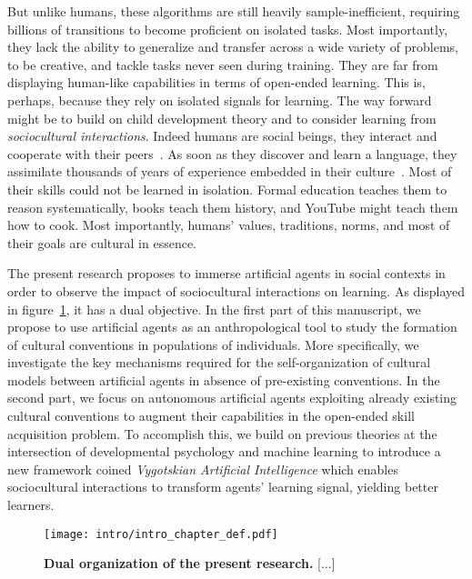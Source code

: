 But unlike humans, these algorithms are still heavily sample-inefficient, requiring billions of transitions to become proficient on isolated tasks. Most importantly, they lack the ability to generalize and transfer across a wide variety of problems, to be creative, and tackle tasks never seen during training. They are far from displaying human-like capabilities in terms of open-ended learning. This is, perhaps, because they rely on isolated signals for learning. The way forward might be to build on child development theory and to consider learning from \textit{sociocultural interactions}. Indeed humans are social beings, they interact and cooperate with their peers~\citep{tomasello_cultural_1999,tomasello_understanding_2005, brewer2014addressing}. As soon as they discover and learn a language, they assimilate thousands of years of experience embedded in their culture~\citep{bruner1991narrative}.  Most of their skills could not be learned in isolation. Formal education teaches them to reason systematically, books teach them history, and YouTube might teach them how to cook. Most importantly, humans' values, traditions, norms, and most of their goals are cultural in essence.

The present research proposes to immerse artificial agents in social contexts in order to observe the impact of sociocultural interactions on learning. As displayed in figure~\ref{fig:intro_chapter_def}, it has a dual objective. In the first part of this manuscript, we propose to use artificial agents as an anthropological tool to study the formation of cultural conventions in populations of individuals. More specifically, we investigate the key mechanisms required for the self-organization of cultural models between artificial agents in absence of pre-existing conventions. In the second part, we focus on autonomous artificial agents exploiting already existing cultural conventions to augment their capabilities in the open-ended skill acquisition problem. To accomplish this, we build on previous theories at the intersection of developmental psychology and machine learning to introduce a new framework coined \textit{Vygotskian Artificial Intelligence} which enables sociocultural interactions to transform agents' learning signal, yielding better learners. 

%
\begin{figure}[!h]
\centering
\texttt{[image: intro/intro\_chapter\_def.pdf]}
\caption{\textbf{Dual organization of the present research.} [...]}
\label{fig:intro_chapter_def}
\end{figure}

